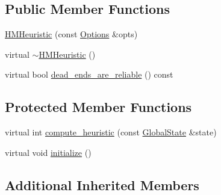 \subsection*{Public Member Functions}
\begin{DoxyCompactItemize}
\item 
\hyperlink{classHMHeuristic_a931b97f30c1cefb5eca83a6e50f245c1}{H\-M\-Heuristic} (const \hyperlink{classOptions}{Options} \&opts)
\item 
virtual \hyperlink{classHMHeuristic_abfaebdc731a46c6d31997d6e270f8dc0}{$\sim$\-H\-M\-Heuristic} ()
\item 
virtual bool \hyperlink{classHMHeuristic_ad30e1f164a0fc3816d8c3d61e2c04df3}{dead\-\_\-ends\-\_\-are\-\_\-reliable} () const 
\end{DoxyCompactItemize}
\subsection*{Protected Member Functions}
\begin{DoxyCompactItemize}
\item 
virtual int \hyperlink{classHMHeuristic_a93f1258117252954de9dabdffe992db7}{compute\-\_\-heuristic} (const \hyperlink{classGlobalState}{Global\-State} \&state)
\item 
virtual void \hyperlink{classHMHeuristic_a5950f9eaced4ece083a012fe306c67a6}{initialize} ()
\end{DoxyCompactItemize}
\subsection*{Additional Inherited Members}


